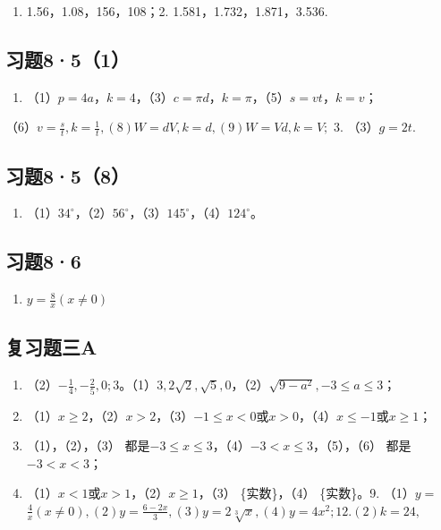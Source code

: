 \begin{enumerate}
\item
  1.56，1.08，156，108；2. 1.581，1.732，1.871，3.536.
\end{enumerate}

\subsection{习题8·5（1）}

\begin{enumerate}[start=2]
\item
  （1）\(p = 4a\)，\(k = 4\)，（3）\(c = \pi d\)，\(k = \pi\)，（5）\(s = vt\)，\(k = v\)；
\end{enumerate}

（6）\(v = \frac{s}{t}, k = \frac{1}{t}, (8) W = dV, k = d, (9) W = Vd, k = V;\)
3. （3）\(g = 2t.\)

\subsection{习题8·5（8）}

\begin{enumerate}[start=2]
\item
  （1）\(34^{\circ}\)，（2）\(56^{\circ}\)，（3）\(145^{\circ}\)，（4）\(124^{\circ}\)。
\end{enumerate}

\subsection{习题8·6}

\begin{enumerate}[start=2]
\item
  \(y = \frac{8}{x} (x\neq 0)\)
\end{enumerate}

\subsection{复习题三A}

\begin{enumerate}[start=2]
\item
  （2）\(-\frac{1}{4}, -\frac{2}{5}, 0; 3\)。（1）\(3, 2\sqrt{2}, \sqrt{5}, 0\)，（2）\(\sqrt{9 - a^2}, -3 \leqslant a \leqslant 3\)；
\item
  （1）\(x \geqslant 2\)，（2）\(x > 2\)，（3）\(-1 \leqslant x < 0\)或\(x > 0\)，（4）\(x \leqslant -1\)或\(x \geqslant 1\)；
\item
  （1），（2），（3）
  都是\(-3 \leqslant x \leqslant 3\)，（4）\(-3 < x \leqslant 3\)，（5），（6）
  都是\(-3 < x < 3\)；
\item
  （1）\(x < 1\)或\(x > 1\)，（2）\(x \geqslant 1\)，（3）
  \{实数\}，（4） \{实数\}。9. （1）\(y =\)
  \(\frac{4}{x} (x \neq 0), (2) y = \frac{6 - 2x}{3}, (3) y = 2\sqrt[3]{x}, (4) y = 4x^2; 12. (2) k = 24,\)
\end{enumerate}

